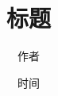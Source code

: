 \documentclass[lang=cn,newtx,10pt,scheme=chinese]{../Template/elegantbook}
\title{标题}
\author{作者}
\institute{机构}
\date{时间}
\begin{document}

\maketitle
\frontmatter

\tableofcontents%

\mainmatter
\everymath{\displaystyle} %











\end{document}
